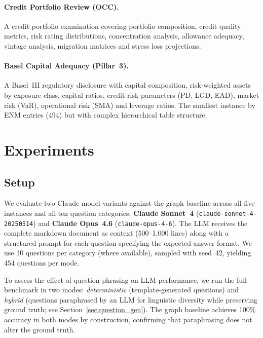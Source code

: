\documentclass[11pt]{article}
\begin{document}
\paragraph{Credit Portfolio Review (OCC).}
A credit portfolio examination covering portfolio composition, credit quality
metrics, risk rating distributions, concentration analysis, allowance
adequacy, vintage analysis, migration matrices and stress loss projections.

\paragraph{Basel Capital Adequacy (Pillar~3).}
A Basel~III regulatory disclosure with capital composition, risk-weighted
assets by exposure class, capital ratios, credit risk parameters (PD, LGD,
EAD), market risk (VaR), operational risk (SMA) and leverage ratios.
The smallest instance by ENM entries (494) but with complex hierarchical
table structure.


\section{Experiments}
\label{sec:experiments}

\subsection{Setup}

We evaluate two Claude model variants against the graph baseline across
all five instances and all ten question categories:
\textbf{Claude Sonnet~4} (\texttt{claude-sonnet-4-20250514}) and
\textbf{Claude Opus~4.6} (\texttt{claude-opus-4-6}).  The LLM receives
the complete markdown document as context (500--1{,}000 lines) along
with a structured prompt for each question specifying the expected
answer format.  We use 10 questions per category (where available),
sampled with seed~42, yielding 454 questions per mode.

To assess the effect of question phrasing on LLM performance, we run
the full benchmark in two modes: \emph{deterministic} (template-generated
questions) and \emph{hybrid} (questions paraphrased by an LLM for
linguistic diversity while preserving ground truth; see
Section~\ref{sec:question_gen}).  The graph baseline achieves 100\%
accuracy in both modes by construction, confirming that paraphrasing
does not alter the ground truth.
\end{document}
